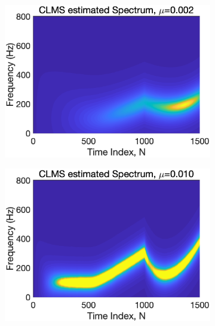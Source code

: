 \begin{figure}[htb]
     \centering
     \hspace{0.4cm}
     \begin{subfigure}[b]{0.35\textwidth}
         \centering
         \includegraphics[width=\textwidth]{fig/32/32b1.eps}
     \end{subfigure}
    \hspace{0.4cm}
     \begin{subfigure}[b]{0.35\textwidth}
         \centering
         \includegraphics[width=\textwidth]{fig/32/32b2.eps}
     \end{subfigure}
    \\
    \hspace{0.4cm}
     \begin{subfigure}[b]{0.35\textwidth}

\end{subfigure}
\end{figure}

